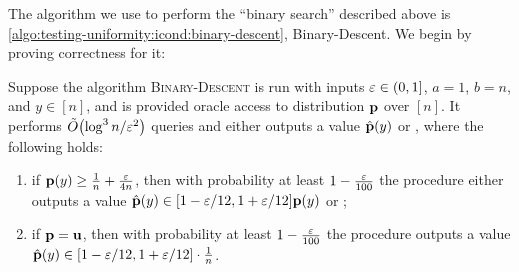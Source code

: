 The algorithm we use to perform the ``binary search'' described above is
\cref{algo:testing-uniformity:icond:binary-descent},
{\sc Binary-Descent}.  We begin by proving correctness for it:


\begin{lemma}\label{lem:intcond-test-uniform:binary-search} Suppose the algorithm \textsc{Binary-Descent} is run with inputs $\varepsilon\in(0,1]$, $a=1$, $b= n$, and $y\in[n]$, and is provided
\ICOND oracle access to distribution $\mathbf{p}$ over $[n]$. It
performs $\tildeO{ \log^3 n/\eps^2 }$ queries and either outputs a value
$\hat{\mathbf{p}}(y)$ or \reject, where the following holds:
\begin{enumerate}
    \item if $\mathbf{p}(y) \geq\frac{1}{n} + \frac{\varepsilon}{4n}$, then with probability at least $1-\frac{\varepsilon}{100}$ the procedure either outputs a value $\hat{\mathbf{p}}(y)\in[1-\varepsilon/12, 1+\varepsilon/12]\mathbf{p}(y)$ or \reject;
    \item if $\mathbf{p}=\mathbf{u}$, then with probability at least $1-\frac{\varepsilon}{100}$ the procedure outputs a value
$\hat{\mathbf{p}}(y)\in[1-\varepsilon/12, 1+\varepsilon/12] \cdot \frac{1}{n}$.
\end{enumerate}
\end{lemma}

